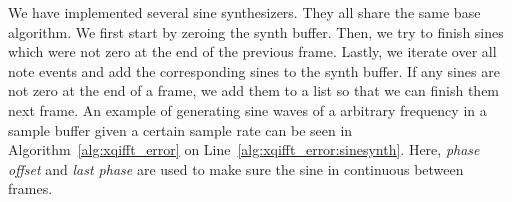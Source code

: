 \documentclass[a4paper,10pt,twocolumn]{article}
\begin{document}
We have implemented several sine synthesizers. They all share the same base algorithm. We first start by zeroing the synth buffer. Then, we try to finish sines which were not zero at the end of the previous frame. Lastly, we iterate over all note events and add the corresponding sines to the synth buffer. If any sines are not zero at the end of a frame, we add them to a list so that we can finish them next frame. An example of generating sine waves of a arbitrary frequency in a sample buffer given a certain sample rate can be seen in Algorithm~\ref{alg:xqifft_error} on Line~\ref{alg:xqifft_error:sinesynth}. Here, \textit{phase offset} and \textit{last phase} are used to make sure the sine in continuous between frames.




\end{document}
